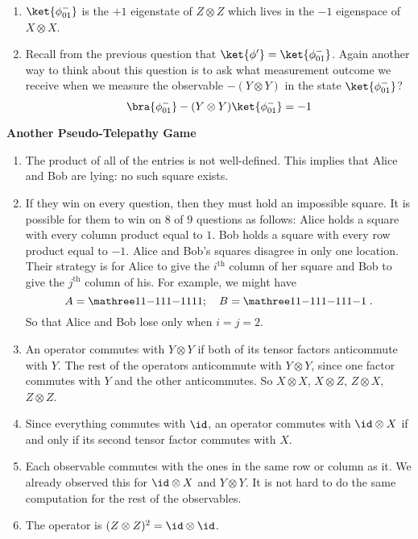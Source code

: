 \begin{exercises}
\begin{enumerate}
\item $\ket{\phi_{01}^-}$ is the $+1$ eigenstate of $Z\otimes Z$ which lives in the $-1$ eigenspace of $X\otimes X$.

\item Recall from the previous question that $\ket{\phi'} = \ket{\phi_{01}^-}$.
	Again another way to think about this question is to ask what measurement outcome we receive when we measure the observable $-(Y\otimes Y)$ in the state $\ket{\phi_{01}^-}$?
	\[
	\bra{\phi_{01}^-}-(Y\otimes Y)\ket{\phi_{01}^-} = -1
	\]
\end{enumerate}

\item {\bf Another Pseudo-Telepathy Game}
\begin{enumerate}
\item The product of all of the entries is not well-defined. This implies that Alice and Bob are lying: no such square exists.

\item If they win on every question, then they must hold an impossible square. It is possible for them to win on $8$ of $9$ questions as follows:
Alice holds a square with every column product equal to $1$. Bob holds a square with every row product equal to $-1$. Alice and Bob's squares disagree in only one location.
Their strategy is for Alice to give the $i^{\text{th}}$ column of her square and Bob to give the $j^{\text{th}}$ column of his.
For example, we might have
\[
A= \mathree
11{-1}
11{-1}
111
; \quad B = \mathree
11{-1}
11{-1}
11{-1}\;.
\]
So that Alice and Bob lose only when $i = j = 2$.

\item An operator commutes with $Y\otimes Y$ if both of its tensor factors anticommute with $Y$. The rest of the operators anticommute with $Y\otimes Y$, since one factor commutes with $Y$ and the other anticommutes. So $X\otimes X$, $X\otimes Z$, $Z\otimes X$, $Z\otimes Z$.

\item Since everything commutes with $\id$, an operator commutes with $\id\otimes X$ if and only if its second tensor factor commutes with $X$.

\item Each observable commutes with the ones in the same row or column as it. We already observed this for $\id\otimes X$ and $Y\otimes Y$. It is not hard to do the same computation for the rest of the observables.

\item The operator is $(Z\otimes Z)^2 =\id\otimes \id$.


\end{enumerate}
\end{exercises}
